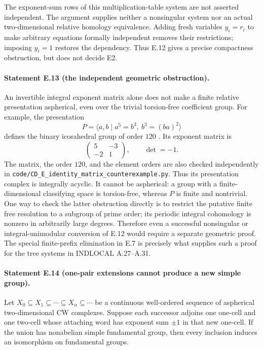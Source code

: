 The exponent-sum rows of this multiplication-table system are not
asserted independent. The argument supplies neither a nonsingular
system nor an actual two-dimensional relative homology equivalence.
Adding fresh variables $y_i=r_i$ to make arbitrary equations
formally independent removes their restrictions; imposing $y_i=1$
restores the dependency. Thus E.12 gives a precise compactness
obstruction, but does not decide E2.

\paragraph{Statement E.13 (the independent geometric obstruction).}
An invertible integral exponent matrix alone does not make a
finite relative presentation aspherical, even over the trivial
torsion-free coefficient group. For example, the presentation
\[
 P=\langle a,b\mid a^5=b^3,\ b^3=(ba)^2\rangle
\]
defines the binary icosahedral group of order $120$
\cite[Example~3.2]{EMikhailovOrr2013}.
Its exponent matrix is
\[
 \begin{pmatrix}5&-3\\-2&1\end{pmatrix},
 \qquad \det=-1.
\]
The matrix, the order $120$, and the element orders are also
checked independently in
\texttt{code/CD\_E\_identity\_matrix\_counterexample.py}.
Thus its presentation complex is integrally acyclic. It cannot
be aspherical: a group with a finite-dimensional classifying
space is torsion-free, whereas $P$ is finite and nontrivial.
One way to check the latter obstruction directly is to restrict
the putative finite free resolution to a subgroup of prime
order; its periodic integral cohomology is nonzero in
arbitrarily large degrees. Therefore even a successful
nonsingular or integral-unimodular conversion of E.12 would
require a separate geometric proof. The special finite-prefix
elimination in E.7 is precisely what supplies such a proof
for the tree systems in INDLOCAL A.27--A.31.

\paragraph{Statement E.14 (one-pair extensions cannot produce a new simple group).}
Let $X_0\subseteq X_1\subseteq\cdots\subseteq X_\alpha
\subseteq\cdots$ be a continuous well-ordered sequence of
aspherical two-dimensional CW complexes. Suppose each successor
adjoins one one-cell and one two-cell whose attaching word has
exponent sum $\pm1$ in that new one-cell. If the union has
nonabelian simple fundamental group, then every inclusion induces
an isomorphism on fundamental groups.

